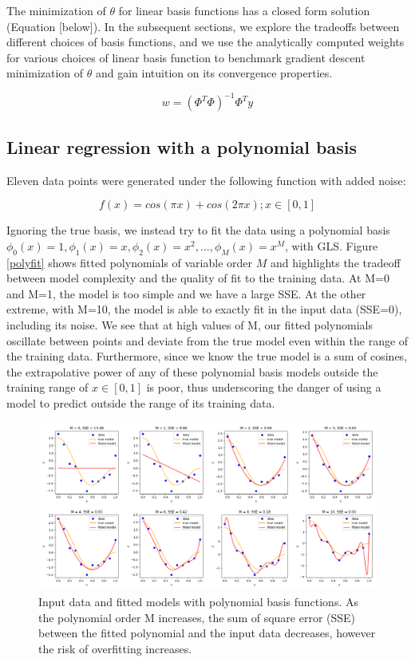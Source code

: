 \documentclass[10pt]{article}
\begin{document}
The minimization of $\theta$ for linear basis functions has a closed form solution (Equation [below]). In the subsequent sections, we explore the tradeoffs between different choices of basis functions, and we use the analytically computed weights for various choices of linear basis function to benchmark gradient descent minimization of $\theta$ and gain intuition on its convergence properties. 

$$w = (\Phi^T\Phi)^{-1}\Phi^Ty$$

\subsection{Linear regression with a polynomial basis}

Eleven data points were generated under the following function with added noise:

$$f(x) = cos(\pi x) + cos(2\pi x); x \in [0,1]$$

Ignoring the true basis, we instead try to fit the data using a polynomial basis $\phi_0(x) = 1, \phi_1(x) = x, \phi_2(x) = x^2, ... , \phi_M(x) = x^M$, with GLS.  Figure \ref{polyfit} shows fitted polynomials of variable order $M$ and highlights the tradeoff between model complexity and the quality of fit to the training data. At M=0 and M=1, the model is too simple and we have a large SSE. At the other extreme, with M=10, the model is able to exactly fit in the input data (SSE=0), including its noise. We see that at high values of M, our fitted polynomials oscillate between points and deviate from the true model even within the range of the training data. Furthermore, since we know the true model is a sum of cosines, the extrapolative power of any of these polynomial basis models outside the training range of $x \in [0,1]$ is poor, thus underscoring the danger of using a model to predict outside the range of its training data.

\begin{figure}
\caption{Input data and fitted models with polynomial basis functions. As the polynomial order M increases, the sum of square error (SSE) between the fitted polynomial and the input data decreases, however the risk of overfitting increases.}
\begin{center}
\includegraphics[width=450px]{all_regress_m}
\end{center}
\label{fig:polyfit}
\end{figure}
\end{document}
